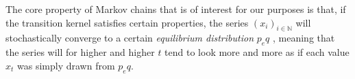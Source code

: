 The core property of Markov chains that is of interest for our purposes is that, if the transition kernel satisfies certain properties, the series $(x_i)_{i \in \mathbb{N}}$ will stochastically converge to a certain \textit{equilibrium distribution} $p_eq$ \cite{bonawitz2008composable}, meaning that the series will for higher and higher $t$ tend to look more and more as if each value $x_t$ was simply drawn from $p_eq$.
